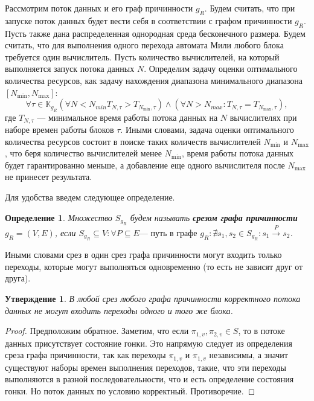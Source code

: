 \documentclass[10pt,a4paper]{article}
\newtheorem{defen}{Определение}
\newtheorem{theorem}{Утверждение}
\begin{document}
  Рассмотрим поток данных и его граф причинности $g_R$. Будем считать, что при запуске поток данных будет вести себя в соответствии с графом причинности $g_R$.
  Пусть также дана распределенная однородная среда бесконечного размера. Будем считать, что для выполнения одного перехода автомата Мили любого блока требуется один вычислитель.
  Пусть количество вычислителей, на который выполняется запуск потока данных $N$. Определим задачу оценки оптимального количества ресурсов, как задачу
  нахождения диапазона минимального диапазона $[N_{\min}, N_{\max}]$:
  $$\forall \tau \in \mathbb{K}_{g_R} (\forall N < N_{min} T_{N, \tau} > T_{N_{\min}, \tau}) \wedge (\forall N > N_{max}: T_{N, \tau} = T_{N_{\max}, \tau}),$$
  где $T_{N, \tau}$ --- минимальное время работы потока данных на $N$ вычислителях при наборе времен работы блоков $\tau$.
  Иными словами, задача оценки оптимального количества ресурсов состоит в поиске таких количеств вычислителей $N_{\min}$ и $N_{\max}$, что
  беря количество вычислителей менее $N_{\min}$, время работы потока данных будет гарантированно меньше, а добавление еще одного вычислителя после $N_{\max}$ не принесет результата.
  
  Для удобства введем следующее определение.
  \begin{defen}
    Множество $S_{g_R}$ будем называть \textbf{срезом графа причинности} $g_R = (V, E)$, если
    $S_{g_R} \subseteq V: \forall P \subseteq E \text{--- путь в графе } g_R: \nexists s_1, s_2 \in S_{g_R}: s_1 \xrightarrow{P} s_2$.
  \end{defen}
  Иными словами срез в один срез графа причинности могут входить только переходы, которые могут выполняться одновременно (то есть не зависят друг от друга).
  
  \begin{theorem}
    В любой срез любого графа причинности корректного потока данных не могут входить переходы одного и того же блока.
  \end{theorem}
  \begin{proof}
    Предположим обратное. Заметим, что если $\pi_{1, v}, \pi_{2, v} \in S$, то в потоке данных присутствует состояние гонки. Это напрямую следует из определения
    среза графа причинности, так как переходы $\pi_{1, v}$ и $\pi_{1, v}$ независимы, а значит существуют наборы времен выполнения переходов, такие, что эти
    переходы выполняются в разной последовательности, что и есть определение состояния гонки. Но поток данных по условию корректный. Противоречие.
  \end{proof}
  
\end{document}

